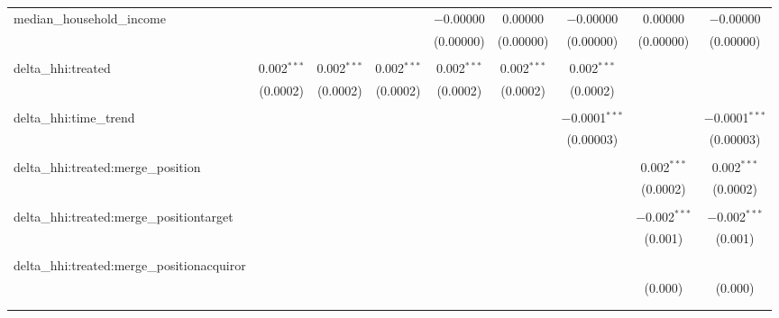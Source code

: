 \begin{table}[H]
{\begin{tabular}{@{\extracolsep{5pt}}lcccccccc}
  median\_household\_income &  &  &  & $-$0.00000 & 0.00000 & $-$0.00000 & 0.00000 & $-$0.00000 \\  

   &  &  &  & (0.00000) & (0.00000) & (0.00000) & (0.00000) & (0.00000) \\  

   & & & & & & & & \\  

  delta\_hhi:treated & 0.002$^{***}$ & 0.002$^{***}$ & 0.002$^{***}$ & 0.002$^{***}$ & 0.002$^{***}$ & 0.002$^{***}$ &  &  \\  

   & (0.0002) & (0.0002) & (0.0002) & (0.0002) & (0.0002) & (0.0002) &  &  \\  

   & & & & & & & & \\  

  delta\_hhi:time\_trend &  &  &  &  &  & $-$0.0001$^{***}$ &  & $-$0.0001$^{***}$ \\  

   &  &  &  &  &  & (0.00003) &  & (0.00003) \\  

   & & & & & & & & \\  

  delta\_hhi:treated:merge\_position &  &  &  &  &  &  & 0.002$^{***}$ & 0.002$^{***}$ \\  

   &  &  &  &  &  &  & (0.0002) & (0.0002) \\  

   & & & & & & & & \\  

  delta\_hhi:treated:merge\_positiontarget &  &  &  &  &  &  & $-$0.002$^{***}$ & $-$0.002$^{***}$ \\  

   &  &  &  &  &  &  & (0.001) & (0.001) \\  

   & & & & & & & & \\  

  delta\_hhi:treated:merge\_positionacquiror &  &  &  &  &  &  &  &  \\  

   &  &  &  &  &  &  & (0.000) & (0.000) \\  

   & & & & & & & & \\  

 \hline \\[-1.8ex]  


\end{tabular}}
\end{table}
